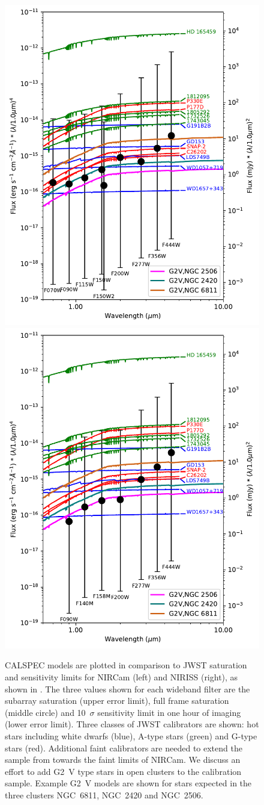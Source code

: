 \documentclass{aastex6}
\begin{document}
\begin{figure}[!hbtp]
\centering
\includegraphics[width=.48\columnwidth]{calspec_and_new_clust.pdf}
\includegraphics[width=.48\columnwidth]{calspec_and_new_clust_niriss.pdf}
\caption{CALSPEC models are plotted in comparison to JWST saturation and sensitivity limits for NIRCam (left) and NIRISS (right), as shown in \citet{gordon2011fluxplan2}.
The three values shown for each wideband filter are the subarray saturation (upper error limit), full frame saturation (middle circle) and 10~$\sigma$ sensitivity limit in one hour of imaging (lower error limit).
Three classes of JWST calibrators are shown: hot stars including white dwarfs (blue), A-type stars (green) and G-type stars (red).
Additional faint calibrators are needed to extend the sample from \citet{gordon2011fluxplan2} towards the faint limits of NIRCam.
We discuss an effort to add G2~V type stars in open clusters to the calibration sample.
Example G2~V \citet{castelli2004models} models are shown for stars expected in the three clusters NGC~6811, NGC~2420 and NGC~2506.
}\label{fig:JWSTcalsWideF}
\end{figure}
\end{document}

